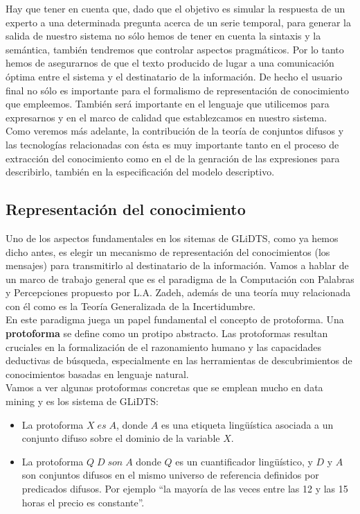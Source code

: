 \documentclass[10pt,a4paper]{article}
\begin{document}
Hay que tener en cuenta que, dado que el objetivo es simular la respuesta de un experto a una determinada pregunta acerca de un serie temporal, para generar la salida de nuestro sistema no sólo hemos de tener en cuenta la sintaxis y la semántica, también tendremos que controlar aspectos pragmáticos. Por lo tanto hemos de asegurarnos de que el texto producido de lugar a una comunicación óptima entre el sistema y el destinatario de la información. De hecho el usuario final no sólo es importante para el formalismo de representación de conocimiento que empleemos. También será importante en el lenguaje que utilicemos para expresarnos y en el marco de calidad que establezcamos en nuestro sistema.\\

Como veremos más adelante, la contribución de la teoría de conjuntos difusos y las tecnologías relacionadas con ésta es muy importante tanto en el proceso de extracción del conocimiento como en el de la genración de las expresiones para describirlo, también en la especificación del modelo descriptivo.

\subsection{Representación del conocimiento}

Uno de los aspectos fundamentales en los sitemas de GLiDTS, como ya hemos dicho antes, es elegir un mecanismo de representación del conocimientos (los mensajes) para transmitirlo al destinatario de la información. Vamos a hablar de un marco de trabajo general que es el paradigma de la Computación con Palabras y Percepciones propuesto por L.A. Zadeh, además de una teoría muy relacionada con él como es la Teoría Generalizada de la Incertidumbre.\\

En este paradigma juega un papel fundamental el concepto de protoforma. Una \textbf{protoforma} se define como un protipo abstracto. Las protoformas resultan cruciales en la formalización de el razonamiento humano y las capacidades deductivas de búsqueda, especialmente en las herramientas de descubrimientos de conocimientos basadas en lenguaje natural.\\

Vamos a ver algunas protoformas concretas que se emplean mucho en data mining y es los sistema de GLiDTS:

\begin{itemize}
\item La protoforma $X \; es \; A$, donde $A$ es una etiqueta lingüística asociada a un conjunto difuso sobre el dominio de la variable $X$.
\item La protoforma $Q \; D \; son \; A$ donde $Q$ es un cuantificador lingüístico, y $D$ y $A$ son conjuntos difusos en el mismo universo de referencia definidos por predicados difusos. Por ejemplo ``la mayoría de las veces entre las 12 y las 15 horas el precio es constante''.
\end{itemize}
\end{document}
